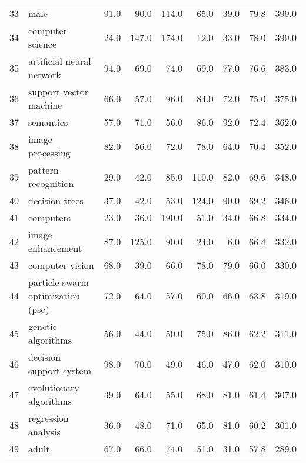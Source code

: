 \begin{tabular}{llrrrrrrr}
33 &                                     male &    91.0 &    90.0 &   114.0 &    65.0 &    39.0 &    79.8 &   399.0 \\
34 &                         computer science &    24.0 &   147.0 &   174.0 &    12.0 &    33.0 &    78.0 &   390.0 \\
35 &                artificial neural network &    94.0 &    69.0 &    74.0 &    69.0 &    77.0 &    76.6 &   383.0 \\
36 &                   support vector machine &    66.0 &    57.0 &    96.0 &    84.0 &    72.0 &    75.0 &   375.0 \\
37 &                                semantics &    57.0 &    71.0 &    56.0 &    86.0 &    92.0 &    72.4 &   362.0 \\
38 &                         image processing &    82.0 &    56.0 &    72.0 &    78.0 &    64.0 &    70.4 &   352.0 \\
39 &                      pattern recognition &    29.0 &    42.0 &    85.0 &   110.0 &    82.0 &    69.6 &   348.0 \\
40 &                           decision trees &    37.0 &    42.0 &    53.0 &   124.0 &    90.0 &    69.2 &   346.0 \\
41 &                                computers &    23.0 &    36.0 &   190.0 &    51.0 &    34.0 &    66.8 &   334.0 \\
42 &                        image enhancement &    87.0 &   125.0 &    90.0 &    24.0 &     6.0 &    66.4 &   332.0 \\
43 &                          computer vision &    68.0 &    39.0 &    66.0 &    78.0 &    79.0 &    66.0 &   330.0 \\
44 &        particle swarm optimization (pso) &    72.0 &    64.0 &    57.0 &    60.0 &    66.0 &    63.8 &   319.0 \\
45 &                       genetic algorithms &    56.0 &    44.0 &    50.0 &    75.0 &    86.0 &    62.2 &   311.0 \\
46 &                  decision support system &    98.0 &    70.0 &    49.0 &    46.0 &    47.0 &    62.0 &   310.0 \\
47 &                  evolutionary algorithms &    39.0 &    64.0 &    55.0 &    68.0 &    81.0 &    61.4 &   307.0 \\
48 &                      regression analysis &    36.0 &    48.0 &    71.0 &    65.0 &    81.0 &    60.2 &   301.0 \\
49 &                                    adult &    67.0 &    66.0 &    74.0 &    51.0 &    31.0 &    57.8 &   289.0 \\

\end{tabular}

